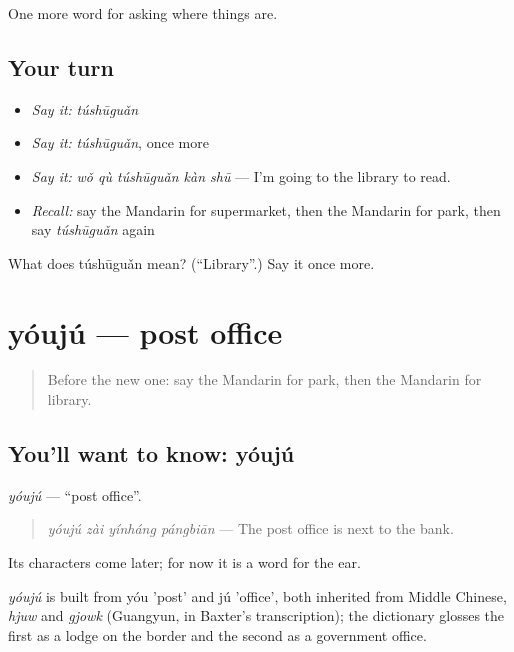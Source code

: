 \begin{grammarlens}[title={What you've built}]
One more word for asking where things are.
\end{grammarlens}

\subsection*{Your turn}
\begin{itemize}
\raggedright
  \item \emph{Say it:} \emph{túshūguǎn}
  \item \emph{Say it:} \emph{túshūguǎn}, once more
  \item \emph{Say it:} \emph{wǒ qù túshūguǎn kàn shū} — I'm going to the library to read.
  \item \emph{Recall:} say the Mandarin for supermarket, then the Mandarin for park, then say \emph{túshūguǎn} again
\end{itemize}

\begin{tcolorbox}[breakable,colback=teal!4,colframe=teal!35!black,title={Before you move on}]
What does túshūguǎn mean? (\textquotedblleft{}Library\textquotedblright{}.) Say it once more.
\end{tcolorbox}
\section[yóujú]{yóujú — post office}

\label{lesson:ZH-C100-youju}



\begin{quote}
Before the new one: say the Mandarin for park, then the Mandarin for library.
\end{quote}

\subsection*{You'll want to know: yóujú}
\emph{yóujú} — \textquotedblleft{}post office\textquotedblright{}.

\begin{quote}
\emph{yóujú zài yínháng pángbiān} — The post office is next to the bank.
\end{quote}

Its characters come later; for now it is a word for the ear.

\begin{cousinweb}
\emph{yóujú} is built from yóu 'post' and jú 'office', both inherited from Middle Chinese, \emph{hjuw} and \emph{gjowk} (Guangyun, in Baxter's transcription); the dictionary glosses the first as a lodge on the border and the second as a government office.
\end{cousinweb}

